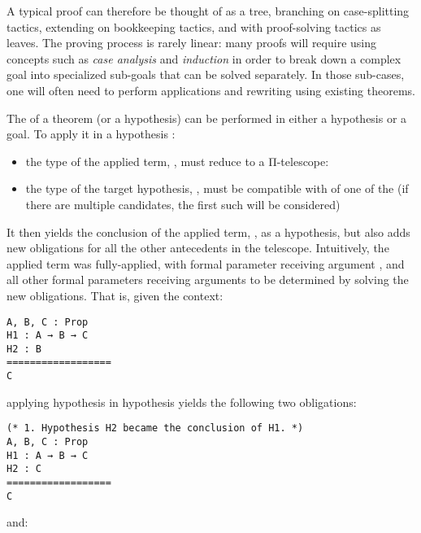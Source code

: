 A typical proof can therefore be thought of as a tree, branching on
case-splitting tactics, extending on bookkeeping tactics, and with proof-solving
tactics as leaves.  The proving process is rarely linear: many proofs will
require using concepts such as \emph{case analysis} and \emph{induction} in
order to break down a complex goal into specialized sub-goals that can be solved
separately.  In those sub-cases, one will often need to perform applications and
rewriting using existing theorems.

The  of a theorem (or a hypothesis)  can
be performed in either a hypothesis or a goal.  To apply it in a hypothesis
:

\begin{itemize}

  \item the type of the applied term, , must reduce to a Π-telescope:


  \item the type of the target hypothesis, , must be compatible
with of one of the  (if there are multiple candidates, the first
such  will be considered)

\end{itemize}

It then yields the conclusion of the applied term, , as a
hypothesis, but also adds new obligations for all the other antecedents in the
telescope.  Intuitively, the applied term  was fully-applied, with
formal parameter  receiving argument , and all other
formal parameters receiving arguments to be determined by solving the new
obligations.  That is, given the context:

\begin{verbatim}
A, B, C : Prop
H1 : A → B → C
H2 : B
==================
C
\end{verbatim}

applying hypothesis  in hypothesis  yields the
following two obligations:

\begin{verbatim}
(* 1. Hypothesis H2 became the conclusion of H1. *)
A, B, C : Prop
H1 : A → B → C
H2 : C
==================
C
\end{verbatim}

and:

